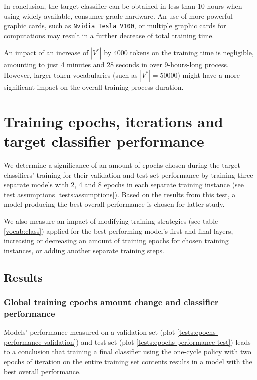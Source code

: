 In conclusion, the target classifier can be obtained in less than 10 hours when using widely available, consumer-grade hardware. An use of more powerful graphic cards, such as \lstinline{Nvidia Tesla V100}, or multiple graphic cards for computations may result in a further decrease of total training time. 

An impact of an increase of $|V^*|$ by 4000 tokens on the training time is negligible, amounting to just 4 minutes and 28 seconds in over 9-hours-long process. However, larger token vocabularies (such as $|V^*| = 50000$) might have a more significant impact on the overall training process duration.

\section{Training epochs, iterations and target classifier performance}

We determine a significance of an amount of epochs chosen during the target classifiers' training for their validation and test set performance by training three separate models with 2, 4 and 8 epochs in each separate training instance (see test assumptions \ref{tests:assumptions}). Based on the results from this test, a model producing the best overall performance is chosen for latter study.

We also measure an impact of modifying training strategies (see table \ref{vocab:class}) applied for the best performing model's first and final layers, increasing or decreasing an amount of training epochs for chosen training instances, or adding another separate training steps. 

\subsection{Results}

\subsubsection{Global training epochs amount change and classifier performance}

Models' performance measured on a validation set (plot \ref{tests:epochs-performance-validation}) and test set (plot \ref{tests:epochs-performance-test}) leads to a conclusion that training a final classifier using the one-cycle policy with two epochs of iteration on the entire training set contents results in a model with the best overall performance. 

